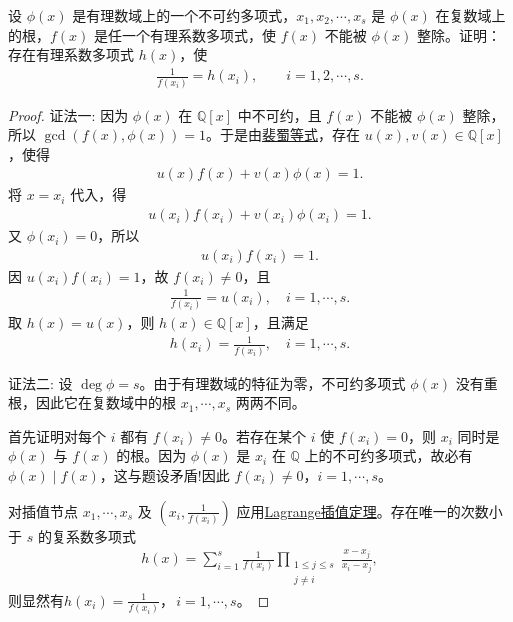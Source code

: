 \documentclass[../../main.tex]{subfiles}%
\begin{document}
\begin{example}
设 $\phi(x)$ 是有理数域上的一个不可约多项式，$x_1,x_2,\cdots,x_s$ 是 $\phi(x)$ 在复数域上的根，$f(x)$ 是任一个有理系数多项式，使 $f(x)$ 不能被 $\phi(x)$ 整除。证明：存在有理系数多项式 $h(x)$，使
\begin{align*}
\frac{1}{f(x_i)}=h(x_i),\qquad i=1,2,\cdots,s.
\end{align*}
\end{example}
\begin{proof}

{\color{blue}证法一:}
因为 $\phi(x)$ 在 $\mathbb{Q}[x]$ 中不可约，且 $f(x)$ 不能被 $\phi(x)$ 整除，所以 $\gcd(f(x),\phi(x))=1$。于是由\hyperref[theorem:最大公因式的必要条件]{裴蜀等式}，存在 $u(x),v(x)\in\mathbb{Q}[x]$，使得
\begin{align*}
u(x)f(x)+v(x)\phi(x)=1.
\end{align*}
将 $x=x_i$ 代入，得
\begin{align*}
u(x_i)f(x_i)+v(x_i)\phi(x_i)=1. 
\end{align*}
又 $\phi(x_i)=0$，所以
\begin{align*}
u(x_i)f(x_i)=1.
\end{align*}
因 $u(x_i)f(x_i)=1$，故 $f(x_i)\neq0$，且
\begin{align*}
\frac{1}{f(x_i)}=u(x_i),\quad i=1,\cdots,s. 
\end{align*}
取 $h(x)=u(x)$，则 $h(x)\in\mathbb{Q}[x]$，且满足
\begin{align*}
h(x_i)=\frac{1}{f(x_i)},\quad i=1,\cdots,s. 
\end{align*}

{\color{blue}证法二:}
设 $\deg\phi=s$。由于有理数域的特征为零，不可约多项式 $\phi(x)$ 没有重根，因此它在复数域中的根 $x_1,\cdots,x_s$ 两两不同。

首先证明对每个 $i$ 都有 $f(x_i)\neq0$。若存在某个 $i$ 使 $f(x_i)=0$，则 $x_i$ 同时是 $\phi(x)$ 与 $f(x)$ 的根。因为 $\phi(x)$ 是 $x_i$ 在 $\mathbb{Q}$ 上的不可约多项式，故必有 $\phi(x)\mid f(x)$，这与题设矛盾!因此 $f(x_i)\neq0$，$i=1,\cdots,s$。

对插值节点 $x_1,\cdots,x_s$ 及 $(x_i,\frac{1}{f(x_i)})$ 应用\hyperref[Numerical Analysis-theorem:Lagrange插值多项式111]{Lagrange插值定理}。存在唯一的次数小于 $s$ 的复系数多项式
\begin{align}
h(x)=\sum\limits_{i=1}^{s}\frac{1}{f(x_i)}\prod\limits_{\substack{1\leqslant j\leqslant s\\j\neq i}}\frac{x-x_j}{x_i-x_j}, \label{lagrange}
\end{align}
则显然有$h(x_i)=\frac{1}{f(x_i)}$，$\,i=1,\cdots,s$。


\end{proof}
\end{document}
